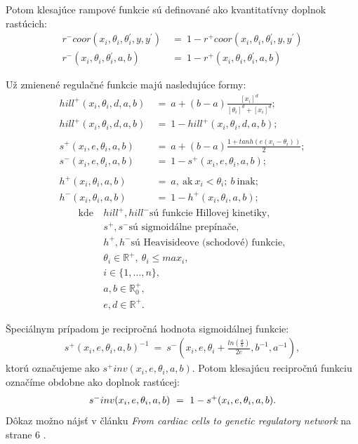 \documentclass[11pt,final,oneside]{fithesis}
\begin{document}
Potom klesaj\'uce rampov\'e funkcie s\'u definovan\'e ako kvantitat\'ivny doplnok rast\'ucich:
\begin{align*}
r^-coor (x_i,\theta{}_i,\theta{}_i^{'},y,y^{'}) &\ = \ 1 - r^+coor (x_i,\theta{}_i,\theta{}_i^{'},y,y^{'})\\
r^- (x_i, \theta{}_i, \theta{}_i^{'}, a,b) &\ = \ 1 - r^+ (x_i, \theta{}_i, \theta{}_i^{'}, a,b)
\end{align*}

U\v z zmienen\'e regula\v cn\'e funkcie maj\'u nasleduj\'uce formy:
\begin{align*}
hill^+(x_i, \theta_i, d, a, b) &\ = \ a + (b - a)\frac{[x_i]^d}{[\theta_i]^d + [x_i]^d};\\
hill^+(x_i, \theta_i, d, a, b) &\ = \ 1 - hill^+(x_i, \theta_i, d, a, b);\\
\\
s^+(x_i, e, \theta_i, a, b) &\ = \ a + (b - a)\frac{1 + tanh(e(x_i - \theta_i))}{2};\\
s^-(x_i, e, \theta_i, a, b) &\  = \ 1 - s^+(x_i, e, \theta_i, a, b);\\
\\
h^+(x_i,\theta_i,a,b) &\ = \ a,\ \textrm{ak}\ x_i < \theta_i;\ b\ \textrm{inak};\\
h^-(x_i,\theta_i,a,b) &\ = \ 1 - h^+(x_i,\theta_i,a,b);
\end{align*}
\begin{align*}
\textrm{kde}\ &hill^+, hill^- \textrm{s\'u funkcie Hillovej kinetiky,}\\
&s^+, s^- \textrm{s\'u sigmoid\'alne prep\'ina\v ce},\\
&h^+, h^- \textrm{s\'u Heavisideove (schodov\'e) funkcie},\\
&\theta_i \in \mathbb{R}^+, \ \theta_i \leq max_i,\\
&i \in \{1,\dots{},n\},\\
&a, b \in \mathbb{R}_0^+,\\
&e, d \in \mathbb{R}^+.
\end{align*}

\noindent\v Speci\'alnym pr\'ipadom je recipro\v cn\'a hodnota sigmoid\'alnej funkcie:
\begin{align*}
s^+(x_i, e, \theta_i, a, b)^{-1} \ = \ s^-(x_i, e, \theta_i + \frac{ln(\frac{a}{b})}{2e}, b^{-1}, a^{-1}),
\end{align*}
ktor\'u ozna\v cujeme ako $s^+inv(x_i, e, \theta_i, a, b)$. Potom klesaj\'ucu recipro\v cn\'u funkciu ozna\v c\'ime obdobne ako doplnok rast\'ucej:
\begin{align*}
\centerline{$s^-inv(x_i, e, \theta_i, a, b) \ = \ 1 - s^+(x_i, e, \theta_i, a, b)$.}
\end{align*}D\^ okaz mo\v zno n\'ajs\v t v \v cl\'anku \textit{From cardiac cells to genetic regulatory network} na strane 6 \cite{CAV-2011}.
\end{document}
